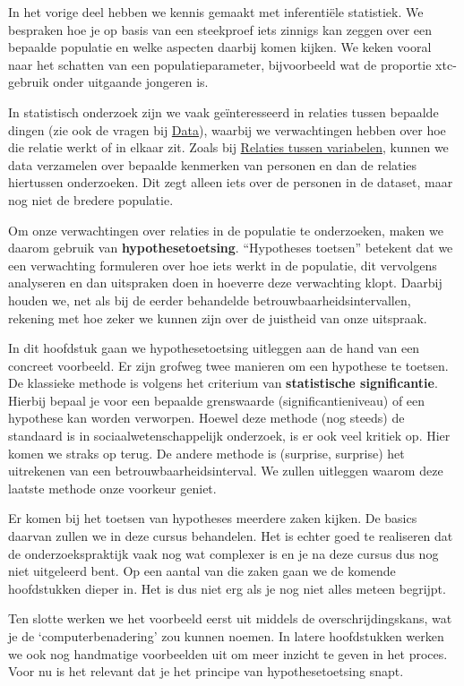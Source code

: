 \documentclass[
  letterpaper,
  DIV=11,
  numbers=noendperiod]{scrreprt}
\begin{document}
In het vorige deel hebben we kennis gemaakt met inferentiële statistiek.
We bespraken hoe je op basis van een steekproef iets zinnigs kan zeggen
over een bepaalde populatie en welke aspecten daarbij komen kijken. We
keken vooral naar het schatten van een populatieparameter, bijvoorbeeld
wat de proportie xtc-gebruik onder uitgaande jongeren is.

In statistisch onderzoek zijn we vaak geïnteresseerd in relaties tussen
bepaalde dingen (zie ook de vragen bij \hyperref[data]{Data}), waarbij
we verwachtingen hebben over hoe die relatie werkt of in elkaar zit.
Zoals bij \hyperref[relaties-tussen-variabelen]{Relaties tussen
variabelen}, kunnen we data verzamelen over bepaalde kenmerken van
personen en dan de relaties hiertussen onderzoeken. Dit zegt alleen iets
over de personen in de dataset, maar nog niet de bredere populatie.

Om onze verwachtingen over relaties in de populatie te onderzoeken,
maken we daarom gebruik van \textbf{hypothesetoetsing}. ``Hypotheses
toetsen'' betekent dat we een verwachting formuleren over hoe iets werkt
in de populatie, dit vervolgens analyseren en dan uitspraken doen in
hoeverre deze verwachting klopt. Daarbij houden we, net als bij de
eerder behandelde betrouwbaarheidsintervallen, rekening met hoe zeker we
kunnen zijn over de juistheid van onze uitspraak.

In dit hoofdstuk gaan we hypothesetoetsing uitleggen aan de hand van een
concreet voorbeeld. Er zijn grofweg twee manieren om een hypothese te
toetsen. De klassieke methode is volgens het criterium van
\textbf{statistische significantie}. Hierbij bepaal je voor een bepaalde
grenswaarde (significantieniveau) of een hypothese kan worden verworpen.
Hoewel deze methode (nog steeds) de standaard is in
sociaalwetenschappelijk onderzoek, is er ook veel kritiek op. Hier komen
we straks op terug. De andere methode is (surprise, surprise) het
uitrekenen van een betrouwbaarheidsinterval. We zullen uitleggen waarom
deze laatste methode onze voorkeur geniet.

Er komen bij het toetsen van hypotheses meerdere zaken kijken. De basics
daarvan zullen we in deze cursus behandelen. Het is echter goed te
realiseren dat de onderzoekspraktijk vaak nog wat complexer is en je na
deze cursus dus nog niet uitgeleerd bent. Op een aantal van die zaken
gaan we de komende hoofdstukken dieper in. Het is dus niet erg als je
nog niet alles meteen begrijpt.

Ten slotte werken we het voorbeeld eerst uit middels de
overschrijdingskans, wat je de `computerbenadering' zou kunnen noemen.
In latere hoofdstukken werken we ook nog handmatige voorbeelden uit om
meer inzicht te geven in het proces. Voor nu is het relevant dat je het
principe van hypothesetoetsing snapt.
\end{document}
